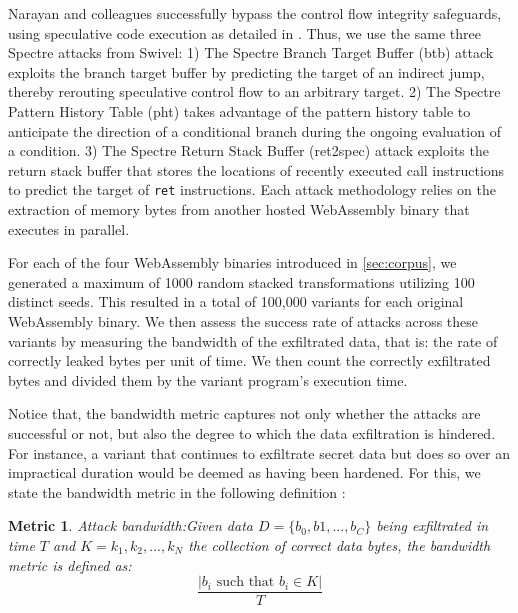\documentclass[a4paper,fleqn]{cas-dc}
\newcommand*\badge[1]{ \colorbox{red}{\color{white}#1}}
\newcommand{\tool}{{\sc Wasm-Mutate}\xspace}
\newcommand{\Wasm}{WebAssembly\xspace}
\newcommand{\wasm}{\Wasm}
\newtheorem{metric}{Metric}
\newcommand{\todo}[1]{%
\refstepcounter{todo}
\noindent\textbf{\badge{TODO}} {\color{red}#1}
\addcontentsline{td}{todo}
{\color{red}\thesection.\thetodo\xspace #1}}
\begin{document}

Narayan and colleagues successfully bypass the control flow integrity safeguards, using speculative code execution as detailed in \cite{Spectre}. 
Thus, we use the same three Spectre attacks from Swivel:
1) The Spectre Branch Target Buffer (btb) attack exploits the branch target buffer by predicting the target of an indirect jump, thereby rerouting speculative control flow to an arbitrary target.
2) The Spectre Pattern History Table (pht) takes advantage of the pattern history table to anticipate the direction of a conditional branch during the ongoing evaluation of a condition. 
3) The Spectre Return Stack Buffer (ret2spec) attack exploits the return stack buffer that stores the locations of recently executed call instructions to predict the target of \texttt{ret} instructions. 
Each attack methodology relies on the extraction of memory bytes from another hosted \wasm binary that executes in parallel.


For each of the four \wasm binaries introduced in \autoref{sec:corpus}, we generated a maximum of 1000 random stacked transformations utilizing 100 distinct seeds. 
This resulted in a total of 100,000 variants for each original \wasm binary.
We then assess the success rate of attacks across these variants by measuring the bandwidth of the exfiltrated data, that is: the rate of correctly leaked bytes per unit of time. 
We then count the correctly exfiltrated bytes and divided them by the variant program's execution time. 

Notice that, the bandwidth metric captures not only whether the attacks are successful or not, but also the degree to which the data exfiltration is hindered.
For instance, a variant that continues to exfiltrate secret data but does so over an impractical duration would be deemed as having been hardened. 
For this, we state the bandwidth metric in the following definition :

\begin{metric}{Attack bandwidth:}\label{metric:ber}
Given data $D=\{b_0, b1, ..., b_C\}$ being exfiltrated in time $T$ and $K = {k_1, k_2, ..., k_N}$ the collection of correct data bytes, the bandwidth metric is defined as:
$$
    \frac{|b_i\text{ such that } b_i \in K|}{T}
$$
\end{metric}
\end{document}
